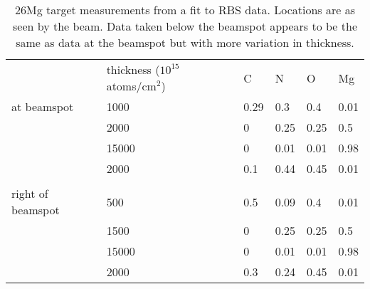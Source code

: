 \documentclass[12pt]{article}
\begin{document}
\begin{table}[h]
\centering
\begin{tabular}{llllll}
            & thickness ($10^{15}$ atoms/cm$^2$) & C & N & O & Mg \\
at beamspot & 1000 & 0.29 & 0.3 & 0.4 & 0.01 \\
            & 2000 & 0 & 0.25 & 0.25 & 0.5 \\
	    & 15000 & 0 & 0.01 & 0.01 & 0.98 \\
	    & 2000 & 0.1 & 0.44 & 0.45 & 0.01 \\ \\

right of beamspot & 500 & 0.5 & 0.09 & 0.4 & 0.01 \\
                  & 1500 & 0 & 0.25 & 0.25 & 0.5 \\
		  & 15000 & 0 & 0.01 & 0.01 & 0.98 \\
		  & 2000 & 0.3 & 0.24 & 0.45 & 0.01 \\
\end{tabular}
\caption{26Mg target measurements from a fit to RBS data.  Locations are as seen by the beam.  Data taken below the beamspot appears to be the same as data at the beamspot but with more variation in thickness.}
\end{table}
\end{document}
